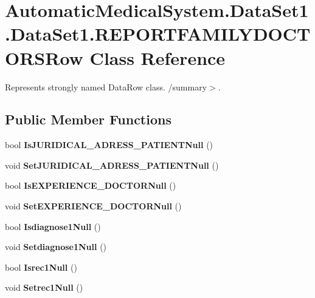\section{AutomaticMedicalSystem.DataSet1.DataSet1.REPORTFAMILYDOCTORSRow Class Reference}
\label{class_automatic_medical_system_1_1_data_set1_1_1_r_e_p_o_r_t_f_a_m_i_l_y_d_o_c_t_o_r_s_row}
Represents strongly named DataRow class. /summary$>$.  


\subsection*{Public Member Functions}
\begin{CompactItemize}
\item 
bool \textbf{IsJURIDICAL\_\-ADRESS\_\-PATIENTNull} ()\label{class_automatic_medical_system_1_1_data_set1_1_1_r_e_p_o_r_t_f_a_m_i_l_y_d_o_c_t_o_r_s_row_6e01b4520958c638c881b21a52863cfa}

\item 
void \textbf{SetJURIDICAL\_\-ADRESS\_\-PATIENTNull} ()\label{class_automatic_medical_system_1_1_data_set1_1_1_r_e_p_o_r_t_f_a_m_i_l_y_d_o_c_t_o_r_s_row_740491596eca6b9b06ca0fe15af70625}

\item 
bool \textbf{IsEXPERIENCE\_\-DOCTORNull} ()\label{class_automatic_medical_system_1_1_data_set1_1_1_r_e_p_o_r_t_f_a_m_i_l_y_d_o_c_t_o_r_s_row_2f6ccd6338846ed2c4cc657d20445724}

\item 
void \textbf{SetEXPERIENCE\_\-DOCTORNull} ()\label{class_automatic_medical_system_1_1_data_set1_1_1_r_e_p_o_r_t_f_a_m_i_l_y_d_o_c_t_o_r_s_row_41c84471356b4f091601db1dfb0ff4cd}

\item 
bool \textbf{Isdiagnose1Null} ()\label{class_automatic_medical_system_1_1_data_set1_1_1_r_e_p_o_r_t_f_a_m_i_l_y_d_o_c_t_o_r_s_row_acb3375674b2fb761459ae49efe6b112}

\item 
void \textbf{Setdiagnose1Null} ()\label{class_automatic_medical_system_1_1_data_set1_1_1_r_e_p_o_r_t_f_a_m_i_l_y_d_o_c_t_o_r_s_row_5eaa8b33cd276526760fd5a1eea241be}

\item 
bool \textbf{Isrec1Null} ()\label{class_automatic_medical_system_1_1_data_set1_1_1_r_e_p_o_r_t_f_a_m_i_l_y_d_o_c_t_o_r_s_row_aa7cfa8d9e4650a51f86d82febb853da}

\item 
void \textbf{Setrec1Null} ()\label{class_automatic_medical_system_1_1_data_set1_1_1_r_e_p_o_r_t_f_a_m_i_l_y_d_o_c_t_o_r_s_row_1287706e220cc6802fca54e0a003900a}

\end{CompactItemize}

